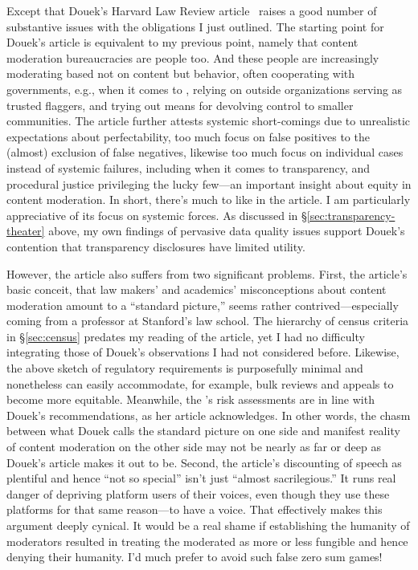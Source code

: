 Except that Douek's Harvard Law Review article~\cite{Douek2022} raises a good
number of substantive issues with the obligations I just outlined. The starting
point for Douek's article is equivalent to my previous point, namely that
content moderation bureaucracies are people too. And these people are
increasingly moderating based not on content but behavior, often cooperating
with governments, e.g., when it comes to , relying on outside organizations
serving as trusted flaggers, and trying out means for devolving control to
smaller communities. The article further attests systemic short-comings due to
unrealistic expectations about perfectability, too much focus on false positives
to the (almost) exclusion of false negatives, likewise too much focus on
individual cases instead of systemic failures, including when it comes to
transparency, and procedural justice privileging the lucky few---an important
insight about equity in content moderation. In short, there's much to like in
the article. I am particularly appreciative of its focus on systemic forces. As
discussed in \S\ref{sec:transparency-theater} above, my own findings of
pervasive data quality issues support Douek's contention that transparency
disclosures have limited utility.

However, the article also suffers from two significant problems. First, the
article's basic conceit, that law makers' and academics' misconceptions about
content moderation amount to a ``standard picture,'' seems rather
contrived---especially coming from a professor at Stanford's law school. The
hierarchy of census criteria in \S\ref{sec:census} predates my reading of the
article, yet I had no difficulty integrating those of Douek's observations I had
not considered before. Likewise, the above sketch of regulatory requirements is
purposefully minimal and nonetheless can easily accommodate, for example, bulk
reviews and appeals to become more equitable. Meanwhile, the 's risk
assessments are in line with Douek's recommendations, as her article
acknowledges. In other words, the chasm between what Douek calls the standard
picture on one side and manifest reality of content moderation on the other side
may not be nearly as far or deep as Douek's article makes it out to be. Second,
the article's discounting of speech as plentiful and hence ``not so special''
isn't just ``almost sacrilegious.'' It runs real danger of depriving platform
users of their voices, even though they use these platforms for that same
reason---to have a voice. That effectively makes this argument deeply cynical.
It would be a real shame if establishing the humanity of moderators resulted in
treating the moderated as more or less fungible and hence denying their
humanity. I'd much prefer to avoid such false zero sum games!


